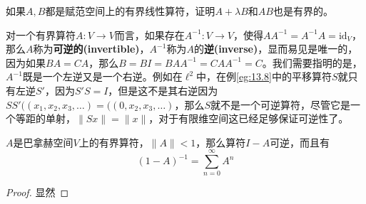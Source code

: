 \begin{exercise}
    如果\(A,B\)都是赋范空间上的有界线性算符，证明\(A+\lambda B\)和\(AB\)也是有界的。
\end{exercise}
对一个有界算符\(A:V\rightarrow V\)而言，如果存在\(A^{-1}:V\rightarrow V\)，使得\(A A^{-1}=A^{-1} A=\mathrm{id}_V\)，那么\(A\)称为\textbf{可逆的(invertible)}，\(A^{-1}\)称为\(A\)的\textbf{逆(inverse)}，显而易见是唯一的，因为如果\(BA=CA\)，那么$B=B I=B A A^{-1}=C A A^{-1}=C$。我们需要指明的是，\(A^{-1}\)既是一个左逆又是一个右逆。例如在\(\ell^2\)中，在例\ref{eg:13.8}中的平移算符\(S\)就只有左逆\(S'\)，因为\(S'S=I\)，但是这不是其右逆因为\(SS'(\left(x_{1}, x_{2}, x_{3}, \ldots\right)=(\left(0, x_{2}, x_{3}, \ldots\right)\)，那么\(S\)就不是一个可逆算符，尽管它是一个等距的单射，\(\|Sx\|=\|x\|\)，对于有限维空间这已经足够保证可逆性了。
\begin{theorem}\label{thm:13.12}
    \(A\)是巴拿赫空间\(V\)上的有界算符，\(\|A\|<1\)，那么算符\(I-A\)可逆，而且有
    \[(1-A)^{-1}=\sum_{n=0}^{\infty}A^n\]
\end{theorem}
\begin{proof}
    显然
\end{proof}

